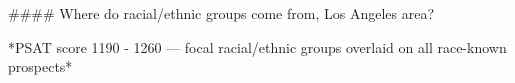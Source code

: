 #### Where do racial/ethnic groups come from, Los Angeles area?

*PSAT score 1190 - 1260 — focal racial/ethnic groups overlaid on all race-known prospects*
